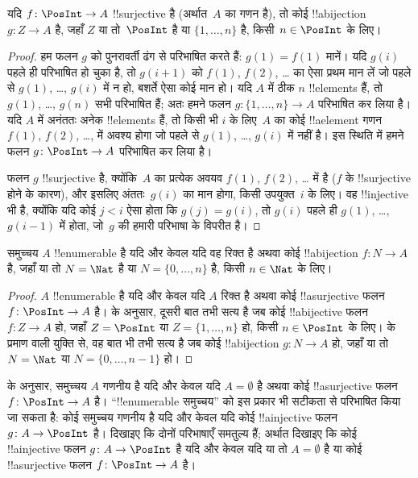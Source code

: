 \documentclass[../../../include/open-logic-section]{subfiles}
\begin{document}
\begin{prop}
यदि $f\colon \PosInt \to A$ !!{surjective} है (अर्थात~$A$ का गणन है), तो
कोई !!a{bijection} $g\colon Z \to A$ है, जहाँ $Z$ या तो~$\PosInt$ है या
$\{1, \dots, n\}$ है, किसी~$n \in \PosInt$ के लिए।
\end{prop}

\begin{proof}
  हम फलन $g$ को पुनरावर्ती ढंग से परिभाषित करते हैं: $g(1) = f(1)$ मानें।
  यदि $g(i)$ पहले ही परिभाषित हो चुका है, तो $g(i+1)$ को $f(1)$, $f(2)$,
  \dots{} का ऐसा प्रथम मान लें जो पहले से $g(1)$, \dots, $g(i)$ में न हो,
  बशर्ते ऐसा कोई मान हो। यदि $A$ में ठीक $n$ !!{element}s हैं, तो $g(1)$,
  \dots, $g(n)$ सभी परिभाषित हैं; अतः हमने फलन $g\colon \{1, \dots, n\}
  \to A$ परिभाषित कर लिया है। यदि $A$ में अनंततः अनेक !!{element}s हैं, तो
  किसी भी $i$ के लिए~$A$ का कोई !!a{element} गणन $f(1)$, $f(2)$, \dots,
  में अवश्य होगा जो पहले से $g(1)$, \dots, $g(i)$ में नहीं है। इस
  स्थिति में हमने फलन $g\colon \PosInt \to A$ परिभाषित कर लिया है।
  
  फलन $g$ !!{surjective} है, क्योंकि~$A$ का प्रत्येक अवयव $f(1)$, $f(2)$,
  \dots{} में है ($f$ के !!{surjective} होने के कारण), और इसलिए अंततः~$g(i)$
  का मान होगा, किसी उपयुक्त~$i$ के लिए। वह !!{injective} भी है, क्योंकि यदि कोई
  $j < i$ ऐसा होता कि $g(j) = g(i)$, तो $g(i)$ पहले ही $g(1)$, \dots,
  $g(i-1)$ में होता, जो~$g$ की हमारी परिभाषा के विपरीत है।
\end{proof}

\begin{cor}
समुच्चय $A$ !!{enumerable} है यदि और केवल यदि वह रिक्त है अथवा कोई
!!a{bijection} $f\colon N \to A$ है, जहाँ या तो $N = \Nat$ है या
$N = \{0, \dots, n\}$ है, किसी $n \in \Nat$ के लिए।
\end{cor}

\begin{proof}
$A$ !!{enumerable} है यदि और केवल यदि $A$ रिक्त है अथवा कोई
!!a{surjective} फलन $f\colon \PosInt \to A$ है।  के
अनुसार, दूसरी बात तभी सत्य है जब कोई !!a{bijective} फलन~$f\colon Z \to A$
हो, जहाँ $Z =
\PosInt$ या $Z = \{1, \dots, n\}$ हो, किसी $n \in \PosInt$ के लिए।
 के प्रमाण वाली युक्ति
से, वह बात भी तभी सत्य है जब कोई !!a{bijection} $g\colon N \to A$ हो,
जहाँ या तो $N = \Nat$ या $N = \{0, \dots, n-1\}$ हो।
\end{proof}

\begin{prob}
   के अनुसार, समुच्चय $A$ गणनीय है
  यदि और केवल यदि $A = \emptyset$ है अथवा कोई !!a{surjective} फलन $f\colon
  \PosInt \to A$ है। ``!!{enumerable} समुच्चय'' को इस प्रकार भी सटीकता से
  परिभाषित किया जा सकता है: कोई समुच्चय गणनीय है यदि और केवल यदि कोई
  !!a{injective} फलन $g\colon A \to \PosInt$ है। दिखाइए कि दोनों परिभाषाएँ
  समतुल्य हैं; अर्थात दिखाइए कि कोई !!a{injective} फलन
  $g\colon A \to \PosInt$ है यदि और केवल यदि या तो $A = \emptyset$ है या
  कोई !!a{surjective} फलन $f\colon \PosInt \to A$ है।
\end{prob}
\end{document}
